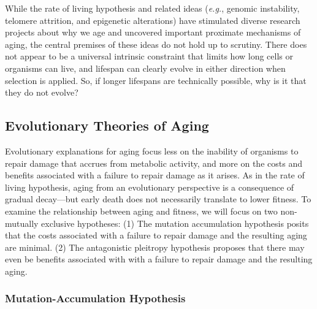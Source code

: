 \documentclass[
]{book}
\begin{document}
While the rate of living hypothesis and related ideas (\emph{e.g.}, genomic instability, telomere attrition, and epigenetic alterations) have stimulated diverse research projects about why we age and uncovered important proximate mechanisms of aging, the central premises of these ideas do not hold up to scrutiny. There does not appear to be a universal intrinsic constraint that limits how long cells or organisms can live, and lifespan can clearly evolve in either direction when selection is applied. So, if longer lifespans are technically possible, why is it that they do not evolve?

\hypertarget{evolutionary-theories-of-aging}{%
\subsection{Evolutionary Theories of Aging}\label{evolutionary-theories-of-aging}}

Evolutionary explanations for aging focus less on the inability of organisms to repair damage that accrues from metabolic activity, and more on the costs and benefits associated with a failure to repair damage as it arises. As in the rate of living hypothesis, aging from an evolutionary perspective is a consequence of gradual decay---but early death does not necessarily translate to lower fitness. To examine the relationship between aging and fitness, we will focus on two non-mutually exclusive hypotheses: (1) The mutation accumulation hypothesis posits that the costs associated with a failure to repair damage and the resulting aging are minimal. (2) The antagonistic pleitropy hypothesis proposes that there may even be benefits associated with with a failure to repair damage and the resulting aging.

\hypertarget{mutation-accumulation-hypothesis}{%
\subsubsection*{Mutation-Accumulation Hypothesis}\label{mutation-accumulation-hypothesis}}
\end{document}
